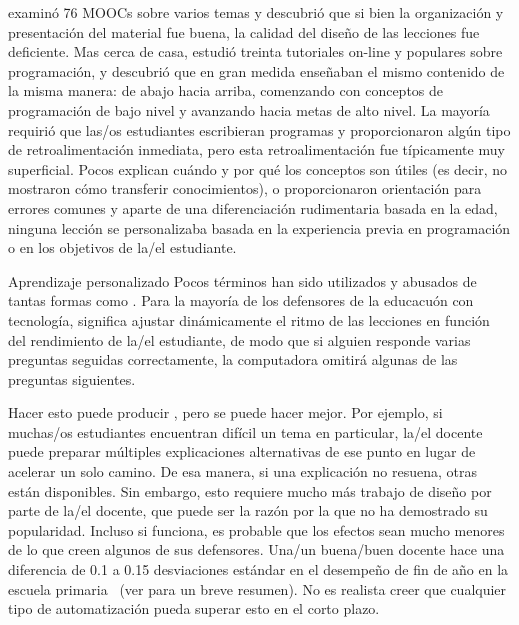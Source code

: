 \cite{Marg2015} examinó 76 MOOCs sobre varios temas y descubrió que
si bien la organización y presentación del material fue buena,
la calidad del diseño de las lecciones fue deficiente.
Mas cerca de casa,
\cite{Kim2017} estudió treinta tutoriales on-line y populares sobre programación,
y descubrió que en gran medida enseñaban el mismo contenido de la misma manera:
de abajo hacia arriba,
comenzando con conceptos de programación de bajo nivel y avanzando hacia metas de alto nivel.
La mayoría requirió que las/os estudiantes escribieran programas y proporcionaron algún tipo de retroalimentación inmediata,
pero esta retroalimentación fue típicamente muy superficial.
Pocos explican cuándo y por qué los conceptos son útiles
(es decir, no mostraron cómo transferir conocimientos),
o proporcionaron orientación para errores comunes
y aparte de una diferenciación rudimentaria basada en la edad,
ninguna lección se personalizaba basada en la experiencia previa en programación o en los objetivos de la/el estudiante.

\begin{aside}{Aprendizaje personalizado}
  Pocos términos han sido utilizados y abusados ​​de tantas formas 
  como .
  Para la mayoría de los defensores de la educacuón con tecnología,
  significa ajustar dinámicamente el ritmo de las lecciones en función del rendimiento de la/el estudiante,
  de modo que si alguien responde varias preguntas seguidas correctamente,
  la computadora omitirá algunas de las preguntas siguientes.

  Hacer esto puede producir
  ,
  pero se puede hacer mejor.
  Por ejemplo,
  si muchas/os estudiantes encuentran difícil un tema en particular,
  la/el docente puede preparar múltiples explicaciones alternativas de ese punto
  en lugar de acelerar un solo camino.
  De esa manera,
  si una explicación no resuena,
  otras están disponibles.
  Sin embargo,
  esto requiere mucho más trabajo de diseño por parte de la/el docente,
  que puede ser la razón por la que no ha demostrado su popularidad.
  Incluso si funciona,
  es probable que los efectos sean mucho menores de lo que creen algunos de sus defensores.
  Una/un buena/buen docente hace una diferencia de 0.1 a 0.15 desviaciones estándar en el desempeño de fin de año en la escuela primaria~\cite{Chet2014}
  (ver  para un breve resumen).
  No es realista creer que cualquier tipo de automatización pueda superar esto en el corto plazo.
\end{aside}


